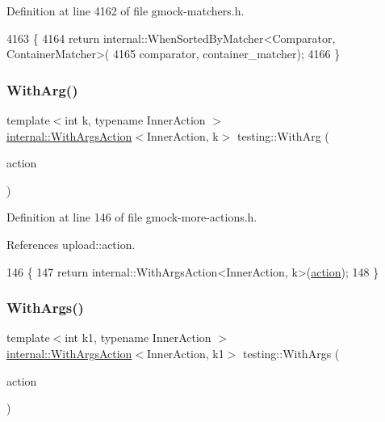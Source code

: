 Definition at line 4162 of file gmock-\/matchers.\+h.


\begin{DoxyCode}
4163                                                         \{
4164   \textcolor{keywordflow}{return} internal::WhenSortedByMatcher<Comparator, ContainerMatcher>(
4165       comparator, container\_matcher);
4166 \}
\end{DoxyCode}
\mbox{\label{namespacetesting_af76590c6cecc621e1ab4b681a9ea209b}} 
\subsubsection{\texorpdfstring{With\+Arg()}{WithArg()}}
{\footnotesize\ttfamily template$<$int k, typename Inner\+Action $>$ \\
\hyperlink{classtesting_1_1internal_1_1WithArgsAction}{internal\+::\+With\+Args\+Action}$<$Inner\+Action, k$>$ testing\+::\+With\+Arg (\begin{DoxyParamCaption}\item[{const Inner\+Action \&}]{action }\end{DoxyParamCaption})\hspace{0.3cm}{\ttfamily [inline]}}



Definition at line 146 of file gmock-\/more-\/actions.\+h.



References upload\+::action.


\begin{DoxyCode}
146                                    \{
147   \textcolor{keywordflow}{return} internal::WithArgsAction<InnerAction, k>(\hyperlink{namespaceupload_a675d13c979f1c720866d22ed1736f580}{action});
148 \}
\end{DoxyCode}
\mbox{\label{namespacetesting_a3bd9eef13bee9065b19d3cd571829c7c}} 
\subsubsection{\texorpdfstring{With\+Args()}{WithArgs()}\hspace{0.1cm}{\footnotesize\ttfamily [1/10]}}
{\footnotesize\ttfamily template$<$int k1, typename Inner\+Action $>$ \\
\hyperlink{classtesting_1_1internal_1_1WithArgsAction}{internal\+::\+With\+Args\+Action}$<$Inner\+Action, k1$>$ testing\+::\+With\+Args (\begin{DoxyParamCaption}\item[{const Inner\+Action \&}]{action }\end{DoxyParamCaption})\hspace{0.3cm}{\ttfamily [inline]}}



